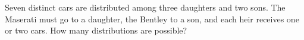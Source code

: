 Seven distinct cars are distributed among three daughters and two sons. The Maserati must go to a daughter, the Bentley to a son, and each heir receives one or two cars. How many distributions are possible?
